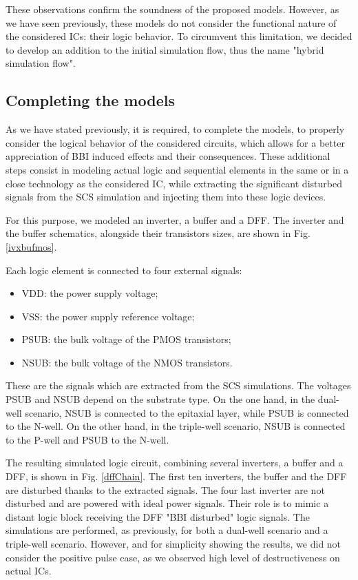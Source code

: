	These observations confirm the soundness of the proposed models.
	However, as we have seen previously, these models do not consider the functional nature of the considered ICs: their logic behavior.
	To circumvent this limitation, we decided to develop an addition to the initial simulation flow, thus the name "hybrid simulation flow".

\subsection{Completing the models}
	As we have stated previously, it is required, to complete the models, to properly consider the logical behavior of the considered circuits, which allows for a better appreciation of BBI induced effects and their consequences.
	These additional steps consist in modeling actual logic and sequential elements in the same or in a close technology as the considered IC, while extracting the significant disturbed signals from the SCS simulation and injecting them into these logic devices.
	
	For this purpose, we modeled an inverter, a buffer and a DFF.
	The inverter and the buffer schematics, alongside their transistors sizes, are shown in Fig. \ref{ivxbufmos}.
%	

	Each logic element is connected to four external signals:
	\begin{itemize}
		\item VDD: the power supply voltage;
		\item VSS: the power supply reference voltage;
		\item PSUB: the bulk voltage of the PMOS transistors;
		\item NSUB: the bulk voltage of the NMOS transistors.
	\end{itemize}
	These are the signals which are extracted from the SCS simulations.
	The voltages PSUB and NSUB depend on the substrate type.
	On the one hand, in the dual-well scenario, NSUB is connected to the epitaxial layer, while PSUB is connected to the N-well.
	On the other hand, in the triple-well scenario, NSUB is connected to the P-well and PSUB to the N-well.
	
	The resulting simulated logic circuit, combining several inverters, a buffer and a DFF, is shown in Fig. \ref{dffChain}.
	The first ten inverters, the buffer and the DFF are disturbed thanks to the extracted signals.
	The four last inverter are not disturbed and are powered with ideal power signals.
	Their role is to mimic a distant logic block receiving the DFF "BBI disturbed" logic signals.
	The simulations are performed, as previously, for both a dual-well scenario and a triple-well scenario.
	However, and for simplicity showing the results, we did not consider the positive pulse case, as we observed high level of destructiveness on actual ICs.
